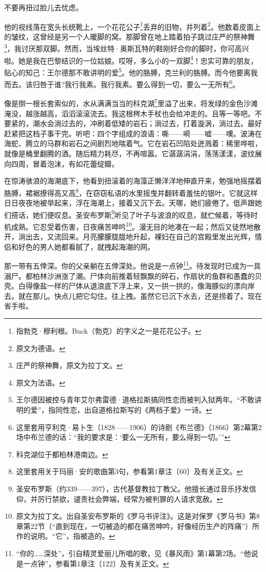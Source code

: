 \par 不要再扭过脸儿去忧虑。
\par 他的视线落在宽头长统靴上，一个花花公子\footnote{指勃克·穆利根。Buck（勃克）的字义之一是花花公子。}丢弃的旧物，并列着\footnote{原文为德语。}。他数着皮面上的皱纹，这曾经是另一个人暖脚的窝。那脚曾在地上踏着拍子跳过庄严的祭神舞\footnote{庄严的祭神舞，原文为拉丁文。}，我讨厌那双脚。然而，当埃丝特·奥斯瓦特的鞋刚好合你的脚时，你可高兴啦。她是我在巴黎结识的一位姑娘。哎呀，多么小的一双脚\footnote{原文为法语。}！忠实可靠的朋友，贴心的知己：王尔德那不敢讲明的爱\footnote{王尔德因被控与青年艾尔弗雷德·道格拉斯搞同性恋而被判入狱两年。“不敢讲明的爱”，指同性恋，出自道格拉斯写的《两档子爱》一诗。}。他的胳膊，克兰利的胳膊。而今他要离我而去。该归咎于谁?我行我素。我行我素。要么得到一切，要么一无所有\footnote{这里套用亨利克·易卜生（1828——1906）的诗剧《布兰德》（1866）第2幕第2场中布兰德的话：“我的要求是：‘要么一无所有，要么得到一切。’”}。
\par 像是捯一根长套索似的，水从满满当当的科克湖\footnote{科克湖位于都柏林港南边。}里溢了出来，将发绿的金色沙滩淹没，越涨越高，滔滔滚滚流去。我这根梣木手杖也会给冲走的。且等一等吧。不要紧的，潮水会淌过去的，冲刷着低矮的岩石；淌过去，打着漩涡，淌过去。最好赶紧把这档子事干完。听吧：四个字组成的浪语：嘶——嗬——嘘——噢。波涛在海蛇、腾立的马群和岩石之间剧烈地喘着气。它在岩石凹陷处迸溅着：稀里哗啦，就像是桶里翻腾的酒。随后精力耗尽，不再喧嚣。它潺潺涓涓，荡荡漾漾，波纹展向四周，冒着泡沫，有如花蕾绽瓣。
\par 在惊涛骇浪的海潮底下，他看到扭滚着的海藻正懒洋洋地伸直开来，勉强地摇摆着胳膊，裙裾撩得高又高\footnote{这里套用关于玛丽·安的歌曲第3句，参看第1章注〔60〕及有关正文。}，在窃窃私语的水里摇曳并翻转着羞怯的银叶。它就这样日日夜夜地被举起来，浮在海潮上，接着又沉下去。天哪，她们疲倦了。低声跟她们搭话，她们便叹息。圣安布罗斯\footnote{圣安布罗斯（约339——397），古代基督教拉丁教父。他擅长通过音乐抒发信仰，并厉行禁欲，谴责社会弊端，经常为被判罪的人请求宽赦。}听见了叶子与波浪的叹息，就伫候着，等待时机成熟。它忍受着伤害，日夜痛苦呻吟\footnote{原文为拉丁文。出自圣安布罗斯的《罗马书评注》。这是对保罗《罗马书》第8章第22节（“直到现在，一切被造的都在痛苦呻吟，好像经历生产的阵痛”）所作的说明。“它”，指被造的。}。漫无目的地凑在一起；然后又徒然地散开，淌出去，又流回来。月亮朦朦胧胧地升起，裸妇在自己的宫殿里发出光辉，情侣和好色的男人她都看腻了，就拽起海潮的网。
\par 那一带有五倖深。你的父亲躺在五倖深处。他说是一点钟\footnote{“你的……深处”，引自精灵爱丽儿所唱的歌，见《暴风雨》第1幕第2场。“他说是一点钟”，参看第1章注〔122〕及有关正文。}。待发现时已成为一具溺尸。都柏林沙洲涨了潮。尸体向前推着轻飘飘的碎石，作扇状的鱼群和愚蠢的贝壳。白得像盐一样的尸体从退浪底下浮上来，又一拱一拱的，像海豚似的漂向岸去。就在那儿。快点儿把它勾住。往上拽。虽然它已沉下水去，还是捞着了。现在省手啦。
